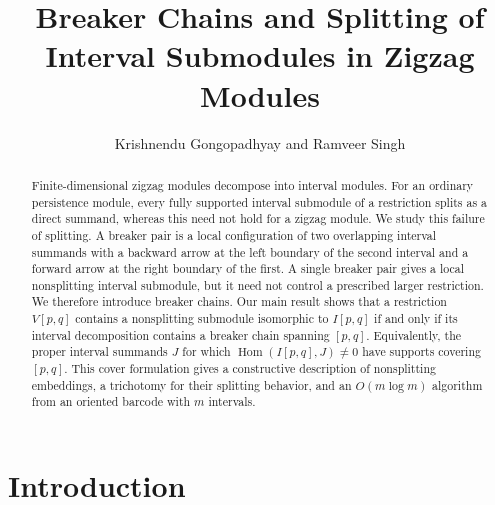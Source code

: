 \documentclass[11pt]{amsart}
\numberwithin{equation}{section}
\theoremstyle{definition}
\begin{document}
\title[Breaker Chains and Splitting]{ Breaker Chains and Splitting of Interval Submodules in Zigzag Modules}

\author[K. Gongopadhyay and R. Singh]{Krishnendu Gongopadhyay and Ramveer Singh}

\address{Indian Institute of Science Education and Research (IISER) Mohali,
Knowledge City, Sector 81, S.A.S. Nagar 140306, Punjab, India}

\address{Indian Institute of Science Education and Research (IISER) Mohali,
Knowledge City, Sector 81, S.A.S. Nagar 140306, Punjab, India}


\begin{abstract}
Finite-dimensional zigzag modules decompose into interval modules.  For an
ordinary persistence module, every fully supported interval submodule of a
restriction splits as a direct summand, whereas this need not hold for a
zigzag module.  We study this failure of splitting.  A breaker pair is a
local configuration of two overlapping interval summands with a backward
arrow at the left boundary of the second interval and a forward arrow at the
right boundary of the first.  A single breaker pair gives a local
nonsplitting interval submodule, but it need not control a prescribed larger
restriction.  We therefore introduce breaker chains.  Our main result shows
that a restriction $V[p,q]$ contains a nonsplitting submodule isomorphic to
$I[p,q]$ if and only if its interval decomposition contains a breaker chain
spanning $[p,q]$.  Equivalently, the proper interval summands $J$ for which
$\operatorname{Hom}(I[p,q],J)\ne0$ have supports covering $[p,q]$.  This
cover formulation gives a constructive description of nonsplitting
embeddings, a trichotomy for their splitting behavior, and an
$O(m\log m)$ algorithm from an oriented barcode with $m$ intervals.
\end{abstract}

\maketitle

\section{Introduction}
\end{document}
